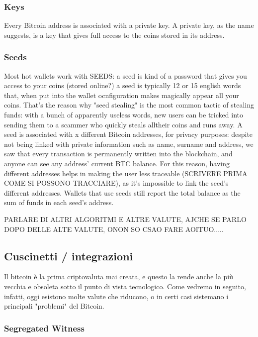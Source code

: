 \documentclass {article}
\begin{document}
\subsubsection {Keys}


Every Bitcoin address is associated with a private key.
A private key, as the name suggests, is a key that gives full access to the coins stored in its address.


\subsubsection {Seeds}


Most hot wallets work with SEEDS: a seed is kind of a password that gives you access to your coins (stored online?) a seed is typically 12 or 15 english words that, when put into the wallet ocnfiguration makes magically appear all your coins.
That's the reason why "seed stealing" is the most common tactic of stealing funds: with a bunch of apparently useless words, new users can be tricked into sending them to a scammer who quickly steals alltheir coins and runs away.
A seed is associated with x different Bitcoin addresses, for privacy purposes: despite not being linked with private information such as name, surname and address, we saw that every transaction is permanently written into the blockchain, and anyone can see any address' current BTC balance.
For this reason, having different addresses helps in making the user less traceable (SCRIVERE PRIMA COME SI POSSONO TRACCIARE), as it's impossible to link the seed's different addresses.
Wallets that use seeds still report the total balance as the sum of funds in each seed's address.


PARLARE DI ALTRI ALGORITMI E ALTRE VALUTE, AJCHE SE PARLO DOPO DELLE ALTE VALUTE, ONON SO CSAO FARE AOITUO.....


\subsection {Cuscinetti / integrazioni}


Il bitcoin è la prima criptovaluta mai creata, e questo la rende anche la più vecchia e obsoleta sotto il punto di vista tecnologico. Come vedremo in seguito, infatti, oggi esistono molte valute che riducono, o in certi casi sistemano i principali "problemi" del Bitcoin.


\subsubsection {Segregated Witness}
\end{document}
